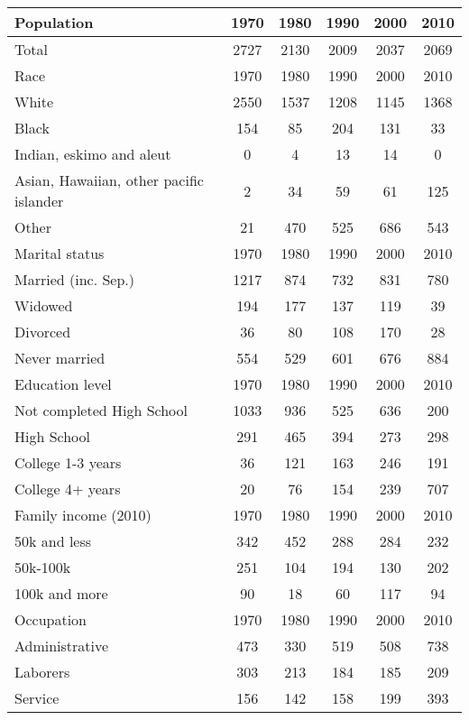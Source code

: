 \begin{tabular}{lccccc}
	\hline
	Population&1970&1980&1990&2000&2010\\
	\hline
	 Total & 2727&2130&2009&2037&2069 \\
	\hline
	Race&1970&1980&1990&2000&2010\\
	\hline
	 White & 2550&1537&1208&1145&1368 \\
	 Black & 154&85&204&131&33 \\
	 Indian, eskimo and aleut & 0&4&13&14&0 \\
	 Asian, Hawaiian, other pacific islander & 2&34&59&61&125 \\
	 Other & 21&470&525&686&543 \\
	\hline
	Marital status&1970&1980&1990&2000&2010\\
	\hline
	 Married (inc. Sep.) & 1217&874&732&831&780 \\
	 Widowed & 194&177&137&119&39 \\
	 Divorced & 36&80&108&170&28 \\
	 Never married & 554&529&601&676&884 \\
	\hline
	Education level&1970&1980&1990&2000&2010\\
	\hline
	 Not completed High School & 1033&936&525&636&200 \\
	 High School & 291&465&394&273&298 \\
	 College 1-3 years & 36&121&163&246&191 \\
	 College 4+ years & 20&76&154&239&707 \\
	\hline
	Family income (2010)&1970&1980&1990&2000&2010\\
	\hline
	 50k and less & 342&452&288&284&232 \\
	 50k-100k & 251&104&194&130&202 \\
	 100k and more & 90&18&60&117&94 \\
	\hline
	Occupation&1970&1980&1990&2000&2010\\
	\hline
	 Administrative & 473&330&519&508&738 \\
	 Laborers & 303&213&184&185&209 \\
	 Service & 156&142&158&199&393 \\
\end{tabular}
